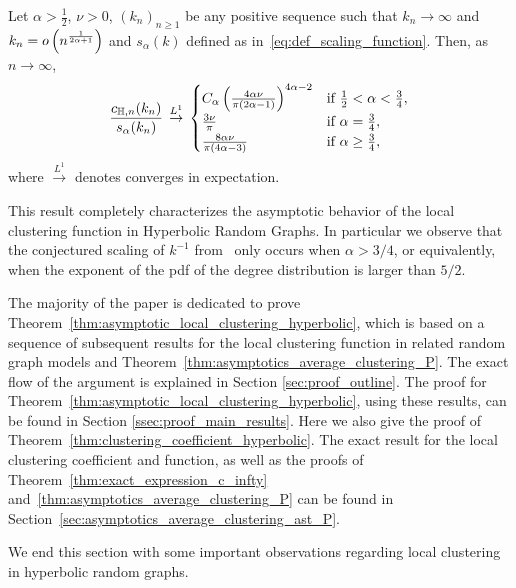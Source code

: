\begin{corollary}
Let $\alpha > \frac{1}{2}$, $\nu > 0$, $(k_n)_{n \ge 1}$ be any positive sequence such that $k_n \to \infty$ and $k_n = o\left(n^{\frac{1}{2\alpha + 1}}\right)$ and $s_\alpha(k)$ defined as in~\eqref{eq:def_scaling_function}. Then, as $n \to \infty$,
\[
	\frac{c_{\mathbb{H},n}(k_n)}{s_\alpha(k_n)} \, \stackrel{L^1}{\rightarrow} \, 
	\begin{cases}
				C_\alpha \left(\frac{4\alpha \nu}{\pi\left(2\alpha - 1\right)}\right)^{4\alpha - 2}
				&\mbox{if } \frac{1}{2} < \alpha < \frac{3}{4},\\
				\frac{3\nu}{\pi} &\mbox{if } \alpha = \frac{3}{4},\\
				\frac{8\alpha \nu}{\pi\left(4\alpha - 3\right)} &\mbox{if } \alpha \ge \frac{3}{4},
		\end{cases}
\]
where $\stackrel{L^1}{\to}$ denotes converges in expectation.
\end{corollary}

This result completely characterizes the asymptotic behavior of the local clustering function in Hyperbolic Random Graphs. In particular we observe that the conjectured scaling of $k^{-1}$ from~\cite{krioukov2010hyperbolic} only occurs when $\alpha > 3/4$, or equivalently, when the exponent of the pdf of the degree distribution is larger than $5/2$. 


The majority of the paper is dedicated to prove Theorem~\ref{thm:asymptotic_local_clustering_hyperbolic}, which is based on a sequence of subsequent results for the local clustering function in related random graph models and Theorem~\ref{thm:asymptotics_average_clustering_P}. The exact flow of the argument is explained in Section \ref{sec:proof_outline}. The proof for Theorem~\ref{thm:asymptotic_local_clustering_hyperbolic}, using these results, can be found in Section \ref{ssec:proof_main_results}. Here we also give the proof of Theorem~\ref{thm:clustering_coefficient_hyperbolic}. The exact result for the local clustering coefficient and function, as well as the proofs of Theorem~\ref{thm:exact_expression_c_infty} and~\ref{thm:asymptotics_average_clustering_P} can be found in Section~\ref{sec:asymptotics_average_clustering_ast_P}.

We end this section with some important observations regarding local clustering in hyperbolic random graphs.

